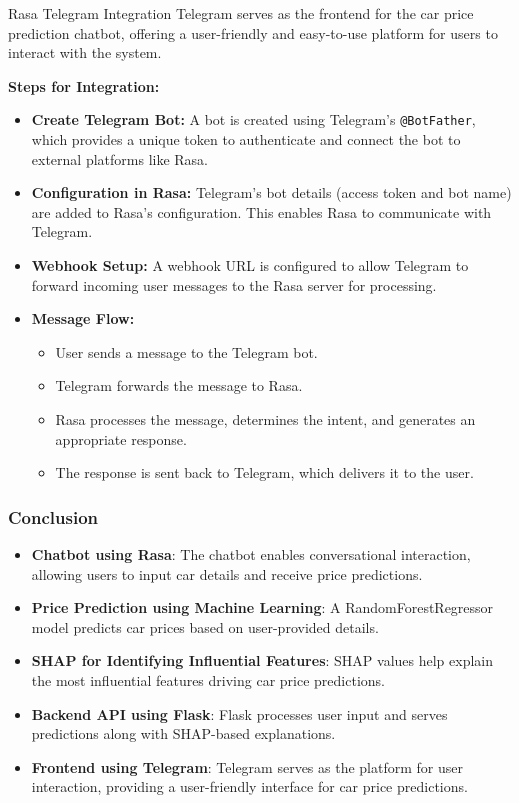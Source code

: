 \documentclass{beamer}
\begin{document}
\begin{frame}{Rasa Telegram Integration}
    Telegram serves as the frontend for the car price prediction chatbot, offering a user-friendly and easy-to-use platform for users to interact with the system.

    \textbf{Steps for Integration:}
    \begin{itemize}
        \item \textbf{Create Telegram Bot:}  
        A bot is created using Telegram's \texttt{@BotFather}, which provides a unique token to authenticate and connect the bot to external platforms like Rasa.
        
        \item \textbf{Configuration in Rasa:}  
        Telegram's bot details (access token and bot name) are added to Rasa's configuration. This enables Rasa to communicate with Telegram.
        
        \item \textbf{Webhook Setup:}  
        A webhook URL is configured to allow Telegram to forward incoming user messages to the Rasa server for processing.
        
        \item \textbf{Message Flow:}  
        \begin{itemize}
            \item User sends a message to the Telegram bot.
            \item Telegram forwards the message to Rasa.
            \item Rasa processes the message, determines the intent, and generates an appropriate response.
            \item The response is sent back to Telegram, which delivers it to the user.
        \end{itemize}
    \end{itemize}
\end{frame}

\begin{frame}
\frametitle{Conclusion}

\begin{itemize}
    \item \textbf{Chatbot using Rasa}: The chatbot enables conversational interaction, allowing users to input car details and receive price predictions.

    \item \textbf{Price Prediction using Machine Learning}: A RandomForestRegressor model predicts car prices based on user-provided details.
    \item \textbf{SHAP for Identifying Influential Features}: SHAP values help explain the most influential features driving car price predictions.
    \item \textbf{Backend API using Flask}: Flask processes user input and serves predictions along with SHAP-based explanations.
    \item \textbf{Frontend using Telegram}: Telegram serves as the platform for user interaction, providing a user-friendly interface for car price predictions.
\end{itemize}

\end{frame}
\end{document}
